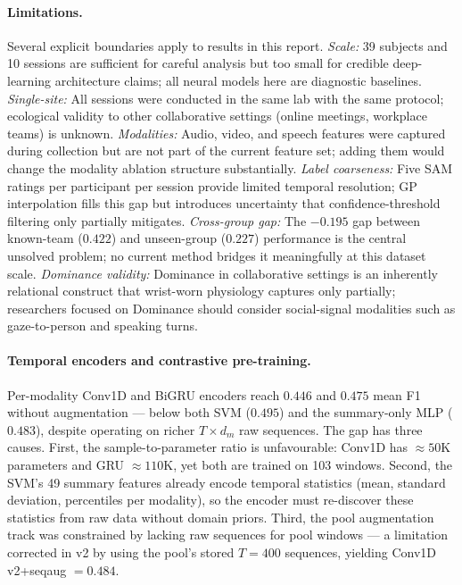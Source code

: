 \documentclass[sigconf,nonacm]{acmart}
\begin{document}
\paragraph{Limitations.}
\label{par:limitations}
Several explicit boundaries apply to results in this report.
\textit{Scale:} 39 subjects and 10 sessions are sufficient for careful analysis
but too small for credible deep-learning architecture claims; all neural models
here are diagnostic baselines.
\textit{Single-site:} All sessions were conducted in the same lab with the same
protocol; ecological validity to other collaborative settings (online meetings,
workplace teams) is unknown.
\textit{Modalities:} Audio, video, and speech features were captured during
collection but are not part of the current feature set; adding them would
change the modality ablation structure substantially.
\textit{Label coarseness:} Five SAM ratings per participant per session provide
limited temporal resolution; GP interpolation fills this gap but introduces
uncertainty that confidence-threshold filtering only partially mitigates.
\textit{Cross-group gap:} The $-0.195$ gap between known-team ($0.422$) and
unseen-group ($0.227$) performance is the central unsolved problem; no current
method bridges it meaningfully at this dataset scale.
\textit{Dominance validity:} Dominance in collaborative settings is an
inherently relational construct that wrist-worn physiology captures only
partially; researchers focused on Dominance should consider social-signal
modalities such as gaze-to-person and speaking turns.

\paragraph{Temporal encoders and contrastive pre-training.}
Per-modality Conv1D and BiGRU encoders reach $0.446$ and $0.475$ mean F1
without augmentation --- below both SVM ($0.495$) and the summary-only MLP
($0.483$), despite operating on richer $T{\times}d_m$ raw sequences.
The gap has three causes.
First, the sample-to-parameter ratio is unfavourable: Conv1D has ${\approx}50$K
parameters and GRU ${\approx}110$K, yet both are trained on 103 windows.
Second, the SVM's 49 summary features already encode temporal statistics
(mean, standard deviation, percentiles per modality), so the encoder must
re-discover these statistics from raw data without domain priors.
Third, the pool augmentation track was constrained by lacking raw sequences for
pool windows --- a limitation corrected in v2 by using the pool's stored
$T{=}400$ sequences, yielding Conv1D v2+seqaug $= 0.484$.
\end{document}
